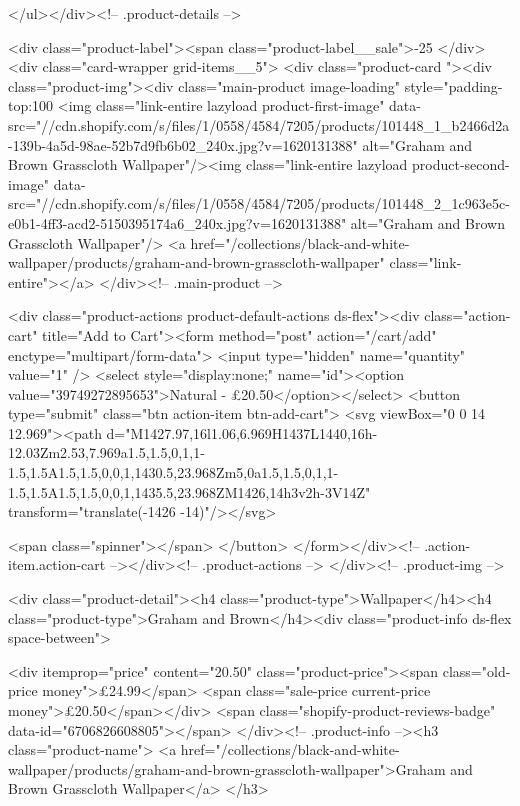 {{{{{{{      </ul></div><!-- .product-details -->

<div class="product-label"><span class="product-label__sale">-25%
          </div><div class="card-wrapper grid-items__5">
            <div class="product-card "><div class="product-img"><div class="main-product image-loading" style="padding-top:100%
      <img class="link-entire lazyload product-first-image" data-src="//cdn.shopify.com/s/files/1/0558/4584/7205/products/101448_1_b2466d2a-139b-4a5d-98ae-52b7d9fb6b02_240x.jpg?v=1620131388" alt="Graham and Brown Grasscloth Wallpaper"/><img class="link-entire lazyload product-second-image" data-src="//cdn.shopify.com/s/files/1/0558/4584/7205/products/101448_2_1c963e5c-e0b1-4ff3-acd2-5150395174a6_240x.jpg?v=1620131388" alt="Graham and Brown Grasscloth Wallpaper"/>
      <a href="/collections/black-and-white-wallpaper/products/graham-and-brown-grasscloth-wallpaper" class="link-entire"></a>
    </div><!-- .main-product -->
  
<div class="product-actions product-default-actions ds-flex"><div class="action-cart" title="Add to Cart"><form method="post" action="/cart/add" enctype="multipart/form-data">
            <input type="hidden" name="quantity" value="1" />
            <select style="display:none;" name="id"><option value="39749272895653">Natural - £20.50</option></select>
            <button type="submit" class="btn action-item btn-add-cart">
              <svg viewBox="0 0 14 12.969"><path d="M1427.97,16l1.06,6.969H1437L1440,16h-12.03Zm2.53,7.969a1.5,1.5,0,1,1-1.5,1.5A1.5,1.5,0,0,1,1430.5,23.968Zm5,0a1.5,1.5,0,1,1-1.5,1.5A1.5,1.5,0,0,1,1435.5,23.968ZM1426,14h3v2h-3V14Z" transform="translate(-1426 -14)"/></svg>

              <span class="spinner"></span>
            </button>
          </form></div><!-- .action-item.action-cart --></div><!-- .product-actions -->
</div><!-- .product-img -->

<div class="product-detail"><h4 class="product-type">Wallpaper</h4><h4 class="product-type">Graham and Brown</h4><div class="product-info ds-flex space-between">
    
<div itemprop="price" content="20.50" class="product-price"><span class="old-price money">£24.99</span>
    <span class="sale-price current-price money">£20.50</span></div>
    <span class="shopify-product-reviews-badge" data-id="6706826608805"></span>
  </div><!-- .product-info --><h3 class="product-name">
      <a href="/collections/black-and-white-wallpaper/products/graham-and-brown-grasscloth-wallpaper">Graham and Brown Grasscloth Wallpaper</a>
    </h3>
    
}}}}}}}

